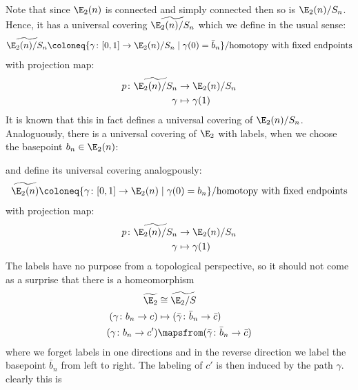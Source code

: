Note that since $\E_2(n)$ is connected and simply connected then so is $\E_2 (n) \slash S_n$. 
Hence, it has a universal covering $\widetilde{\E_2(n) \slash S_n}$ which we define in the usual sense:
\[
    \widetilde{\E_2(n) \slash S_n} \coloneq \{ \gamma \colon [0,1] \to \E_2(n) \slash S_n \mid \gamma(0) = \bar{b}_n \} 
    \slash \text{homotopy with fixed endpoints}
\]
with projection map:
\begin{align*}
    p \colon \widetilde{\E_2(n) \slash S_n} &\to \E_2(n) \slash S_n \\
    \gamma &\mapsto \gamma(1)
\end{align*}
It is known that this in fact defines a universal covering of $\E_2(n) \slash S_n$. 
Analoguously, there is a universal covering of $\E_2$ with labels, when we choose the basepoint
$b_n \in \E_2(n)$:
\begin{center}
\end{center}
and define its universal covering analogpously:
\[
    \widetilde{\E_2(n)} \coloneq \{ \gamma \colon [0,1] \to \E_2(n) \mid \gamma(0) = b_n \} 
    \slash \text{homotopy with fixed endpoints}
\]
with projection map:
\begin{align*}
    p \colon \widetilde{\E_2(n) \slash S_n} &\to \E_2(n) \slash S_n \\
    \gamma &\mapsto \gamma(1)
\end{align*}
The labels have no purpose from a topological perspective, so it should not 
come as a surprise that there is a homeomorphism
\begin{align*}
    \widetilde{\E_2} &\cong \widetilde{\E_2 \slash S} \\
    (\gamma \colon b_n \to c) &\mapsto (\bar{\gamma} \colon \bar{b}_n \to \bar{c}) \\
    (\gamma \colon b_n \to c') &\mapsfrom (\bar{\gamma} \colon \bar{b}_n \to \bar{c}) \\
\end{align*}
where we forget labels in one directions and in the reverse direction we label the basepoint $\bar{b}_n$
from left to right. The labeling of $c'$ is then induced by the path $\gamma$. clearly this is 
